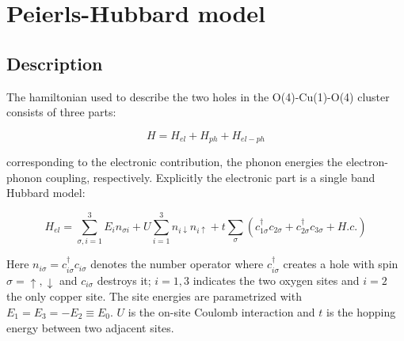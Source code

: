 \chapter{Peierls-Hubbard model}
\label{chap:model}




\section{Description}

The hamiltonian used to describe the two holes in the O(4)-Cu(1)-O(4) cluster consists of three parts\cite{Salkola1994}:

\begin{equation}\label{eq:full-hamiltonian}
H = H_{el} + H_{ph} + H_{el-ph}
\end{equation}

\noindent corresponding to the electronic contribution, the phonon energies the electron-phonon coupling, respectively. 
Explicitly the electronic part is a single band Hubbard model:

\begin{equation}\label{eq:electronic-part}
H_{el} = \sum_{\sigma,i=1}^3 E_i n_{\sigma i} + U\sum_{i=1}^3 n_{i\downarrow}n_{i\uparrow} + t\sum_{\sigma}(c_{1\sigma}^\dagger c_{2\sigma} + c_{2\sigma}^\dagger c_{3\sigma} + H.c.)
\end{equation}

Here $n_{i\sigma}=c_{i\sigma}^\dagger c_{i\sigma}$ denotes the number operator where $c_{i\sigma}^\dagger$ creates a hole with spin $\sigma = \uparrow, \downarrow$ and $c_{i\sigma}$ destroys it; $i=1,3$ indicates the two oxygen sites and $i=2$ the only copper site. 
The site energies are parametrized with $E_1=E_3=-E_2 \equiv E_0$. $U$ is the on-site Coulomb interaction and $t$ is the hopping energy between two adjacent sites.

